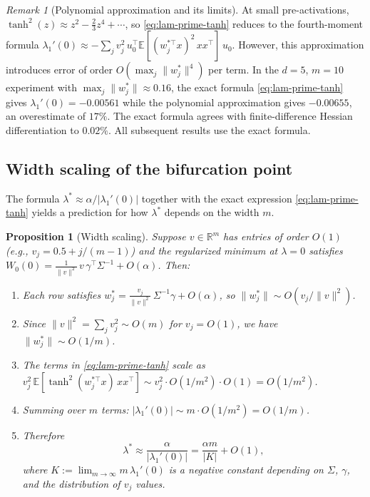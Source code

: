 \documentclass[11pt, reqno]{amsart}
\theoremstyle{plain}
\newtheorem{proposition}[theorem]{Proposition}
\theoremstyle{definition}
\theoremstyle{remark}
\newtheorem{remark}[theorem]{Remark}
\begin{document}
\begin{remark}[Polynomial approximation and its limits]\label{rem:taylor-limits}
At small pre-activations, $\tanh^2(z)\approx z^2-\tfrac23z^4+\cdots$, so \eqref{eq:lam-prime-tanh} reduces to the fourth-moment formula
$\lambda_1'(0)\approx -\sum_j v_j^2\,u_0^\top \mathbb E[(w_j^{*\top}x)^2\,xx^\top]\,u_0$.
However, this approximation introduces error of order $O(\max_j\|w_j^*\|^4)$ per term.  In the $d=5$, $m=10$ experiment with $\max_j\|w_j^*\|\approx 0.16$, the exact formula \eqref{eq:lam-prime-tanh} gives $\lambda_1'(0)=-0.00561$ while the polynomial approximation gives $-0.00655$, an overestimate of $17\%$.  The exact formula agrees with finite-difference Hessian differentiation to $0.02\%$.  All subsequent results use the exact formula.
\end{remark}

\subsection{Width scaling of the bifurcation point}\label{ssec:width-scaling}

The formula $\lambda^*\approx\alpha/|\lambda_1'(0)|$ together with the exact expression \eqref{eq:lam-prime-tanh} yields a prediction for how $\lambda^*$ depends on the width $m$.

\begin{proposition}[Width scaling]\label{prop:width-scaling}
Suppose $v\in\mathbb R^m$ has entries of order $O(1)$ (e.g., $v_j=0.5+j/(m-1)$) and the regularized minimum at $\lambda=0$ satisfies $W_0(0)=\frac{1}{\|v\|^2}\,v\,\gamma^\top\Sigma^{-1}+O(\alpha)$.  Then:
\begin{enumerate}[label=(\roman*)]
\item Each row satisfies $w_j^*=\frac{v_j}{\|v\|^2}\,\Sigma^{-1}\gamma+O(\alpha)$, so $\|w_j^*\|\sim O(v_j/\|v\|^2)$.
\item Since $\|v\|^2=\sum_j v_j^2\sim O(m)$ for $v_j=O(1)$, we have $\|w_j^*\|\sim O(1/m)$.
\item The terms in \eqref{eq:lam-prime-tanh} scale as
$v_j^2\,\mathbb E[\tanh^2(w_j^{*\top}x)\,xx^\top]\sim v_j^2\cdot O(1/m^2)\cdot O(1)=O(1/m^2)$.
\item Summing over $m$ terms:
$|\lambda_1'(0)|\sim m\cdot O(1/m^2)=O(1/m)$.
\item Therefore
\begin{equation}\label{eq:lam-star-scaling}
  \lambda^*\approx\frac{\alpha}{|\lambda_1'(0)|}=\frac{\alpha m}{|K|}+O(1),
\end{equation}
where $K:=\lim_{m\to\infty}m\,\lambda_1'(0)$ is a negative constant depending on $\Sigma$, $\gamma$, and the distribution of $v_j$ values.
\end{enumerate}
\end{proposition}
\end{document}

